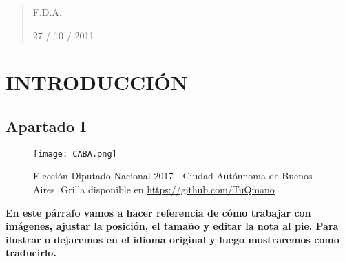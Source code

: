     \begin{abstract}
    
            \lipsum[1-3] %
    
    
                \hfill F.D.A.  %
                
                \hfill 27 / 10 / 2011 %
    
            \thispagestyle{empty} %
    \end{abstract}
    
\clearpage %




\section{INTRODUCCIÓN} %

\subsection*{Apartado I} %
 \lipsum[1]  %
 
 
 
 \begin{figure}[H]  
  \centering 
    \texttt{[image: CABA.png]}
  \caption{Elección Diputado Nacional 2017 - Ciudad Autónnoma de Buenos Aires. Grilla disponible en \href{https://github.com/TuQmano}{https://github.com/TuQmano}}
  \label{fig:CABA}
\end{figure} 

 
 
 \textbf{En este párrafo vamos a hacer referencia de cómo trabajar con imágenes, ajustar la posición, el tamaño y editar la nota al pie. Para ilustrar o dejaremos en el idioma original y luego mostraremos como traducirlo.}
 


